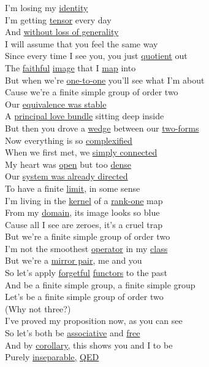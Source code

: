 \documentclass[11pt,paper=letter]{scrartcl}
\makeatletter
\newcommand\@wo[2][]{\hyperref[w:#1]{#2}}
\newcommand\wo{\@dblarg\@wo}
\makeatother
\begin{document}
\noindent
I'm losing my \wo{identity} \\
I'm getting \wo{tensor} every day \\
And \wo{without loss of generality} \\
I will assume that you feel the same way \\

\noindent
Since every time I see you, you just \wo{quotient} out \\
The \wo{faithful} \wo{image} that I \wo{map} into \\
But when we're \wo{one-to-one} you'll see what I'm about \\
Cause we're a finite simple group of order two \\

\noindent
Our \wo[stable equivalence]{equivalence was stable} \\
A \wo[principal bundle]{principal love bundle} sitting deep inside \\
But then you drove a \wo{wedge} between our \wo[form]{two-forms} \\
Now everything is so \wo[complexification]{complexified} \\

\noindent
When we first met, we \wo{simply connected} \\
My heart was \wo{open} but too \wo{dense} \\
Our \wo[directed system]{system was already directed} \\
To have a finite \wo{limit}, in some sense \\

\noindent
I'm living in the \wo{kernel} of a \wo[rank]{rank-one} map \\
From my \wo{domain}, its image looks so blue \\
Cause all I see are zeroes, it's a cruel trap \\
But we're a finite simple group of order two \\

\noindent
I'm not the smoothest \wo{operator} in my \wo{class} \\
But we're a \wo{mirror pair}, me and you \\
So let's apply \wo{forgetful} \wo[functor]{functors} to the past \\
And be a finite simple group, a finite simple group \\
Let's be a finite simple group of order two \\
(Why not three?) \\

\noindent
I've proved my proposition now, as you can see \\
So let's both be \wo{associative} and \wo{free} \\
And by \wo[corollary]{corollary,} this shows you and I to be \\
Purely \wo[separable]{inseparable,} \wo{QED} \\
\end{document}
